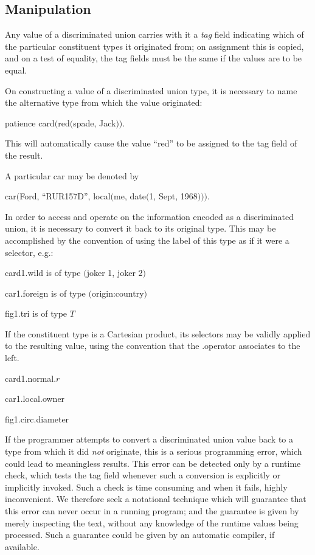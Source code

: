 \subsection{Manipulation}

Any value of a discriminated union carries with it a \textit{tag} field indicating which of the particular constituent types it originated from; on assignment this is copied, and on a test of equality, the tag fields must be the same if the values are to be equal.

On constructing a value of a discriminated union type, it is necessary to name the alternative type from which the value originated:
\smallskip

\quad patience card$($red$($spade, Jack$))$.
\smallskip

\noindent
This will automatically cause the value ``red'' to be assigned to the tag field of the result.

A particular car may be denoted by
\smallskip

\quad car$($Ford, ``RUR157D'', local$($me, date$($1, Sept, 1968$)))$.
\smallskip

In order to access and operate on the information encoded as a discriminated union, it is necessary to convert it back to its original type. This may be accomplished by the convention of using the label of this type as if it were a selector, e.g.:

card1.wild \tabto*{8em} is of type $($joker 1, joker 2$)$

car1.foreign \tabto*{8em} is of type $($origin:country$)$

fig1.tri \tabto*{8em} is of type $T$

\noindent
If the constituent type is a Cartesian product, its selectors may be validly applied to the resulting value, using the convention that the .operator associates to the left.

\quad card1.normal.$r$

\quad car1.local.owner

\quad fig1.circ.diameter

If the programmer attempts to convert a discriminated union value back to a type from which it did \textit{not} originate, this is a serious programming
error, which could lead to meaningless results. This error can be detected only by a runtime check, which tests the tag field whenever such a conversion is explicitly or implicitly invoked. Such a check is time consuming and when it fails, highly inconvenient. We therefore seek a notational technique which will guarantee that this error can never occur in a running program; and the guarantee is given by merely inspecting the text, without any knowledge of the runtime values being processed. Such a guarantee could be given by an automatic compiler, if available.

